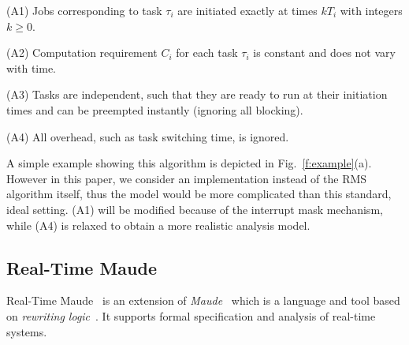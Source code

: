 \documentclass[journal]{IEEEtranTIE}
\begin{document}
(A1) Jobs corresponding to task $\tau_i$ are initiated exactly at
times $kT_i$ with integers $k\ge 0$.

(A2) Computation requirement $C_i$ for each task $\tau_i$ is constant
and does not vary with time.

(A3) Tasks are independent, such that they are ready to run at their
initiation times and can be preempted instantly (ignoring all
blocking).

(A4) All overhead, such as task switching time, is ignored.

A simple example showing this algorithm is depicted in
Fig.~\ref{f:example}(a). However in this paper, we consider an
implementation instead of the RMS algorithm itself, thus the model
would be more complicated than this standard, ideal setting.  (A1)
will be modified because of the interrupt mask mechanism, while (A4)
is relaxed to obtain a more realistic analysis model.

\subsection{Real-Time Maude}
Real-Time Maude~\cite{DBLP:journals/lisp/OlveczkyM07} is an extension
of \emph{Maude}~\cite{DBLP:journals/tcs/ClavelDELMMQ02} which is a
language and tool based on \emph{rewriting
  logic}~\cite{DBLP:journals/jlp/Meseguer12}.  It supports formal
specification and analysis of real-time systems.
\end{document}
